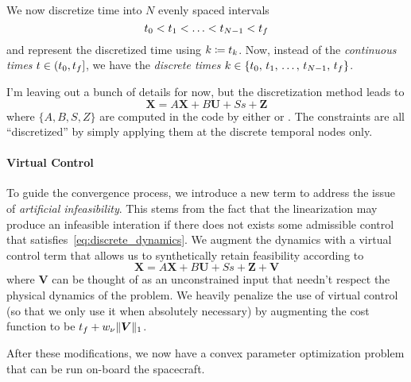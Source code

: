 \documentclass[12pt]{article}
\begin{document}
We now discretize time into $N$ evenly spaced intervals 
\begin{equation}
t_0 < t_1 < \ldots < t_{N-1} < t_f
\end{equation}
and represent the discretized time using $k \coloneqq t_k$. Now, instead of the \textit{continuous times} $t\in(t_0,t_f]$, we have the \textit{discrete times} $k\in\{t_0,\,t_1,\,\ldots,\,t_{N-1},\,t_f\}$.

I'm leaving out a bunch of details for now, but the discretization method leads to
\begin{equation}
\bm{X} = A \bm{X} + B \bm{U} + S s + \bm{Z}
\label{eq:discrete_dynamics}
\end{equation}
where $\{A,B,S,Z\}$ are computed in the code by either  or . The constraints are all ``discretized'' by simply applying them at the discrete temporal nodes only. 

\paragraph{Virtual Control}

To guide the convergence process, we introduce a new term to address the issue of \textit{artificial infeasibility}. This stems from the fact that the linearization may produce an infeasible interation if there does not exists some admissible control that satisfies~\eqref{eq:discrete_dynamics}. We augment the dynamics with a virtual control term that allows us to synthetically retain feasibility according to
\begin{equation}
\bm{X} = A \bm{X} + B \bm{U} + S s + \bm{Z} + \bm{V}
\label{eq:VC_discrete_dynamics}
\end{equation}
where $\bm{V}$ can be thought of as an unconstrained input that needn't respect the physical dynamics of the problem. We heavily penalize the use of virtual control (so that we only use it when absolutely necessary) by augmenting the cost function to be $t_f + w_{\nu} \| \bm{V} \|_1$.

After these modifications, we now have a convex parameter optimization problem that can be run on-board the spacecraft. 
\end{document}
